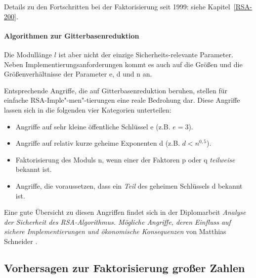 \begin{refsegment}
Details zu den Fortschritten bei der Faktorisierung  seit 1999:
siehe Kapitel~\ref{RSA-200}.



\paragraph*{Algorithmen zur Gitterbasenreduktion} \mbox{}

Die Modullänge $l$ ist aber nicht der einzige Sicherheits-relevante Parameter.
Neben Implementierungsanforderungen kommt es auch auf die Größen und die
Größenverhältnisse der Parameter e, d und n an.

Entsprechende Angriffe, die auf Gitterbasenreduktion
beruhen, stellen für einfache RSA-Imple"-men"-tierungen eine reale Bedrohung
dar. Diese Angriffe lassen sich in die folgenden vier Kategorien unterteilen:
\begin{itemize}
   \item Angriffe auf sehr kleine öffentliche Schlüssel e (z.B. $e = 3$).
   \item Angriffe auf relativ kurze geheime Exponenten d (z.B. $d < n ^ {0,5}$).
   \item Faktorisierung des Moduls n, wenn einer der Faktoren p oder q {\em teilweise} bekannt ist.
   \item Angriffe, die voraussetzen, dass ein {\em Teil} des geheimen Schlüssels d bekannt ist.
\end{itemize}

Eine gute Übersicht zu diesen Angriffen findet sich in der Diplomarbeit
{\em Analyse der Sicherheit des RSA-Algorithmus. Mögliche Angriffe, deren
Einfluss auf sichere Implementierungen und ökonomische Konsequenzen}
von Matthias Schneider \cite{SchneiM2004}.





\subsection{Vorhersagen zur Faktorisierung großer Zahlen}


\end{refsegment}

